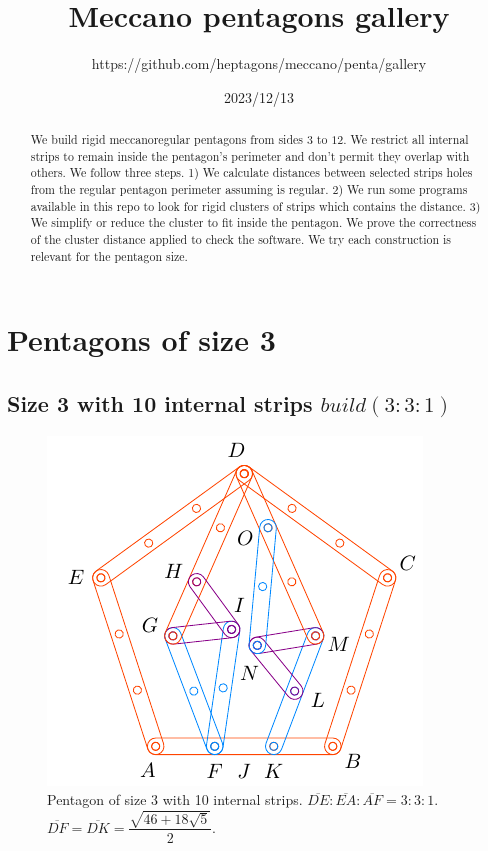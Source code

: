 \documentclass[11pt]{article}
\title{Meccano pentagons gallery}
\author{https://github.com/heptagons/meccano/penta/gallery}
\date{2023/12/13}
\begin{document}
\maketitle
\begin{abstract}
We build rigid meccano\meccanoref regular pentagons from sides $3$ to $12$. We restrict all internal strips to remain inside the pentagon's perimeter and don't permit they overlap with others. We follow three steps. 1) We calculate distances between selected strips holes from the regular pentagon perimeter assuming is regular. 2) We run some programs available in this repo to look for rigid clusters of strips which contains the distance. 3) We simplify or reduce the cluster to fit inside the pentagon. We prove the correctness of the cluster distance applied to check the software. We try each construction is relevant for the pentagon size.
\end{abstract}


\section{Pentagons of size 3}

\subsection{Size 3 with 10 internal strips $build(3:3:1)$}

\begin{figure}[H]
\centering
\includegraphics[scale=1.2]{3/penta3-10a}
\caption{Pentagon of size 3 with 10 internal strips. $\overline{DE}:\overline{EA}:\overline{AF} = 3:3:1$. $\overline{DF} = \overline{DK} = \dfrac{\sqrt{46+18\sqrt5}}2$.}
\label{fig:penta3-10a}
\end{figure}
\end{document}
